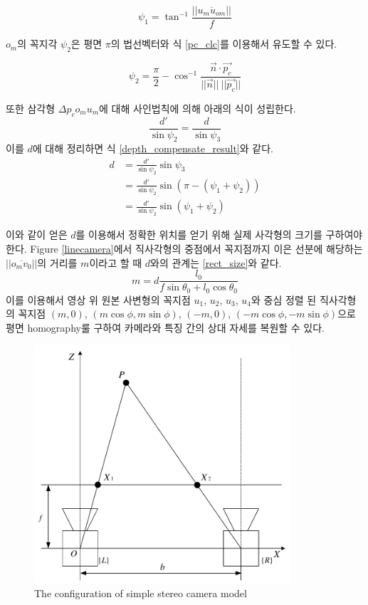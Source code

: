 \documentclass[master,korean,final]{cbnu-ecs}
\begin{document}
\begin{equation}
\label{angle_psi1}
\psi_1 = \tan^{-1}{\frac{||\overline{u_m u_{om}}||}{f}}
\end{equation}

$o_m$의 꼭지각 $\psi_2$은 평면 $\pi$의 법선벡터와 식 \eqref{pc_clc}를 이용해서 유도할 수 있다.

\begin{equation}
\label{angle_psi2}
\psi_2 = \frac{\pi}{2}-\cos^{-1}\frac{\overrightarrow{n}\cdot\overrightarrow{p_c}}{||\overrightarrow{n}||\ ||\overrightarrow{p_c}||}
\end{equation}

또한 삼각형 $\Delta p_c o_m u_m$에 대해 사인법칙에 의해 아래의 식이 성립한다.
\begin{equation}
\label{sine_rule}
\frac{d'}{\sin\psi_2} = \frac{d}{\sin\psi_3}
\end{equation}
이를 $d$에 대해 정리하면 식 \eqref{depth_compensate_result}와 같다.
\begin{equation}\label{depth_compensate_result}
\begin{split}
d & =\frac{d'}{\sin\psi_2}\sin\psi_3 \\
& =\frac{d'}{\sin\psi_2} \sin(\pi-(\psi_1+\psi_2)) \\
& =\frac{d'}{\sin\psi_2} \sin(\psi_1+\psi_2)
\end{split}
\end{equation}

이와 같이 얻은 $d$를 이용해서 정확한 위치를 얻기 위해 실제 사각형의 크기를 구하여야 한다. Figure \ref{linecamera}에서 직사각형의 중점에서 꼭지점까지 이은 선분에 해당하는 $||\overline{o_m v_0}||$의 거리를 $m$이라고 할 때 $d$와의 관계는 \eqref{rect_size}와 같다.
\begin{equation}
\label{rect_size}
m = d \frac{l_0}{f\sin\theta_0 + l_0\cos\theta_0}
\end{equation}
이를 이용해서 영상 위 원본 사변형의 꼭지점 $u_1$, $u_2$, $u_3$, $u_4$와 중심 정렬 된 직사각형의 꼭지점 $(m,0)$, $(m\cos\phi, m\sin\phi)$, $(-m, 0)$, $(-m\cos\phi, -m\sin\phi)$으로 평면 homography룰 구하여 카메라와 특징 간의 상대 자세를 복원할 수 있다.
\begin{figure}[!ht]
  \centering
	\includegraphics[width=360px]{img/stereo_triangulation_cropped.pdf}
  \caption{The configuration of simple stereo camera model}
\label{stereo_triangulation}
\end{figure}
\end{document}
